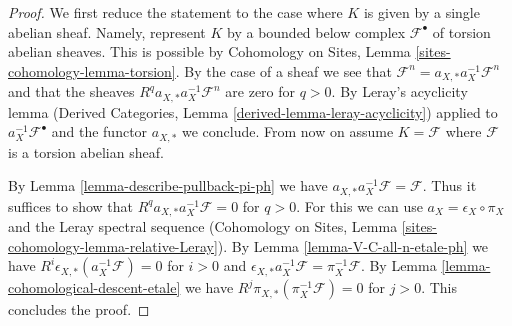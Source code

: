 \documentclass[10pt,a4paper]{amsart}
\theoremstyle{plain}
\theoremstyle{definition}
\theoremstyle{remark}
\numberwithin{equation}{subsection}
\begin{document}
\begin{proof}
We first reduce the statement to the case where
$K$ is given by a single abelian sheaf. Namely, represent $K$
by a bounded below complex $\mathcal{F}^\bullet$ of torsion
abelian sheaves. This is possible by Cohomology on Sites, Lemma
\ref{sites-cohomology-lemma-torsion}. By the case of a
sheaf we see that
$\mathcal{F}^n = a_{X, *} a_X^{-1} \mathcal{F}^n$
and that the sheaves $R^qa_{X, *}a_X^{-1}\mathcal{F}^n$
are zero for $q > 0$. By Leray's acyclicity lemma
(Derived Categories, Lemma \ref{derived-lemma-leray-acyclicity})
applied to $a_X^{-1}\mathcal{F}^\bullet$
and the functor $a_{X, *}$ we conclude. From now on assume $K = \mathcal{F}$
where $\mathcal{F}$ is a torsion abelian sheaf.

\medskip\noindent
By Lemma \ref{lemma-describe-pullback-pi-ph} we have
$a_{X, *}a_X^{-1}\mathcal{F} = \mathcal{F}$. Thus it suffices to show that
$R^qa_{X, *}a_X^{-1}\mathcal{F} = 0$ for $q > 0$.
For this we can use $a_X = \epsilon_X \circ \pi_X$ and
the Leray spectral sequence
(Cohomology on Sites, Lemma \ref{sites-cohomology-lemma-relative-Leray}).
By Lemma \ref{lemma-V-C-all-n-etale-ph}
we have $R^i\epsilon_{X, *}(a_X^{-1}\mathcal{F}) = 0$ for $i > 0$
and $\epsilon_{X, *}a_X^{-1}\mathcal{F} = \pi_X^{-1}\mathcal{F}$.
By Lemma \ref{lemma-cohomological-descent-etale} we have
$R^j\pi_{X, *}(\pi_X^{-1}\mathcal{F}) = 0$ for $j > 0$.
This concludes the proof.
\end{proof}
\end{document}
